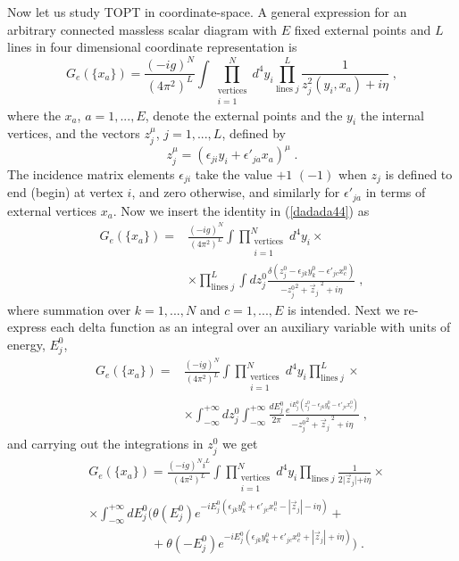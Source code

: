 \documentclass[%
 reprint,
 amsmath,amssymb,
 aps,
]{revtex4-1}
\begin{document}
Now let us study TOPT in coordinate-space.  A general expression for an arbitrary connected massless scalar diagram with $E$ fixed external points and $L$ lines in four dimensional coordinate representation is
\begin{equation}
G_e(\{x_a\})=\frac{(-ig)^N}{(4\pi^2)^L}\int\prod_{\substack{\text{vertices}\\i=1}}^Nd^4y_i\prod_{\text{lines}\;j}^L\frac{1}{z_j^2(y_i,x_a)+i\eta}\;,\label{dadada44}
\end{equation}
where the $x_a$, $a=1,...,E$, denote the external points and the $y_i$ the internal vertices, and the vectors $z_j^\mu$, $j=1,...,L$, defined by
\begin{equation}
z_j^\mu=(\epsilon_{ji}y_i+\epsilon'_{ja}x_a)^\mu\;.
\end{equation}
The incidence matrix elements $\epsilon_{ji}$ take the value $+1$ $(-1)$ when $z_j$ is defined to end (begin) at vertex $i$, and zero otherwise, and similarly for $\epsilon'_{ja}$ in terms of external vertices $x_a$. Now we insert the identity in (\ref{dadada44}) as
\begin{align}
G_e(\{x_a\})=&\frac{(-ig)^N}{(4\pi^2)^L}\int\prod_{\substack{\text{vertices}\\i=1}}^Nd^4y_i\times\nonumber\\
&\times\prod_{\text{lines}\;j}^L\int dz^0_{j}\frac{\delta(z_{j}^0-\epsilon_{jk}y_k^0-\epsilon'_{jc}x^0_c)}{-{z_{j}^0}^2+{\vec{z}_j}^{\;2}+i\eta}\;,\label{dadada441}
\end{align}
where summation over $k=1,...,N$ and $c=1,...,E$ is intended. Next we re-express each delta function as an integral over an auxiliary variable with units of  energy, $E^0_j$,
\begin{align}
G_e(\{x_a\})=&\frac{(-ig)^N}{(4\pi^2)^L}\int\prod_{\substack{\text{vertices}\\i=1}}^Nd^4y_i\prod_{\text{lines}\;j}^L\times\nonumber\\
&\times\int_{-\infty}^{+\infty}dz_{j}^0\int_{-\infty}^{+\infty}\frac{dE^0_j}{2\pi}\frac{e^{iE^0_j(z_{j}^0-\epsilon_{jk}y^0_k-\epsilon'_{jc}x^0_c)}}{-{z_{j}^0}^2+{\vec{z}_j}^{\;2}+i\eta}\;,\label{dadada442}
\end{align}
and carrying out the integrations in $z^0_j$ we get
\begin{align}
&G_e(\{x_a\})=\frac{(-ig)^N i^L}{(4\pi^2)^L}\int\prod_{\substack{\text{vertices}\\i=1}}^Nd^4y_i\nonumber\prod_{\text{lines}\;j}\frac{1}{2|{\vec{z}_j|+i\eta}}\times\\
&\times\int_{-\infty}^{+\infty}{dE^0_j}\Big(\theta (E^0_j)e^{-iE_j^0(\epsilon_{jk}y^0_k+\epsilon'_{jc}x^0_c-|\vec{z}_j|-i\eta)}+\nonumber\\
&\;\;\;\;\;\;\;\;\;\;\;\;\;\;\;\;\;\;+\theta (-E^0_j)e^{-iE_j^0(\epsilon_{jk}y^0_k+
\epsilon'_{jc}x^0_c+|\vec{z}_j|+i\eta)}\Big)\;.\label{dadada443}
\end{align}
\end{document}
